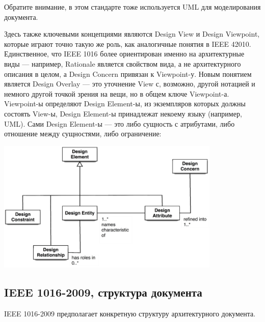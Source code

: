 \documentclass{../mcstext}
\begin{document}
Обратите внимание, в этом стандарте тоже используется UML для моделирования документа.

Здесь также ключевыми концепциями являются Design View и Design Viewpoint, которые играют точно такую же роль, как аналогичные понятия в IEEE 42010. Единственное, что IEEE 1016 более ориентирован именно на архитектурные виды --- например, Rationale является свойством вида, а не архитектурного описания в целом, а Design Concern привязан к Viewpoint-у. Новым понятием является Design Overlay --- это уточнение View с, возможно, другой нотацией и немного другой точкой зрения на вещи, но в общем ключе Viewpoint-а. Viewpoint-ы определяют Design Element-ы, из экземпляров которых должны состоять View-ы, Design Element-ы принадлежат некоему языку (например, UML). Сами Design Element-ы --- это либо сущность с атрибутами, либо отношение между сущностями, либо ограничение:

\begin{center}
    \includegraphics[width=0.8\textwidth]{ieee1016ArchitectureElements.png}
\end{center}

\subsection{IEEE 1016-2009, структура документа}

IEEE 1016-2009 предполагает конкретную структуру архитектурного документа.
\end{document}
